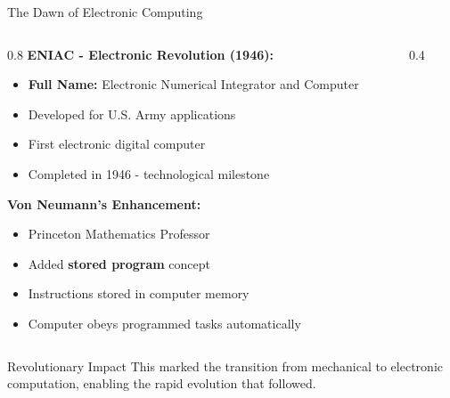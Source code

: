 \documentclass[aspectratio=169]{beamer}
\begin{document}
\begin{frame}{The Dawn of Electronic Computing}
    \begin{columns}
        \begin{column}{0.8\textwidth}
            \textbf{ENIAC - Electronic Revolution (1946):}
            \begin{itemize}
                \item \textbf{Full Name:} Electronic Numerical Integrator and Computer
                \item Developed for U.S. Army applications
                \item First electronic digital computer
                \item Completed in 1946 - technological milestone
            \end{itemize}
            
            \textbf{Von Neumann's Enhancement:}
            \begin{itemize}
                \item Princeton Mathematics Professor
                \item Added \textbf{stored program} concept
                \item Instructions stored in computer memory
                \item Computer obeys programmed tasks automatically
            \end{itemize}
        \end{column}
        \begin{column}{0.4\textwidth}
        \end{column}
    \end{columns}
    
    \begin{block}{Revolutionary Impact}
        This marked the transition from mechanical to electronic computation, enabling the rapid evolution that followed.
    \end{block}
\end{frame}
\end{document}
